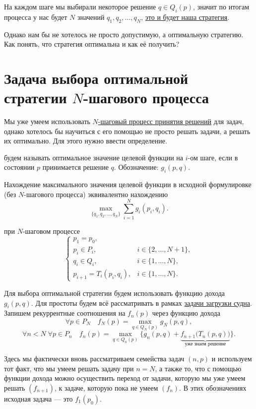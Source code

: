 На каждом шаге мы выбирали некоторое решение $q \in Q_i(p)$, значит по итогам процесса у нас будет $N$ значений $q_1, q_2, \dots, q_N$, \underline{это и будет наша стратегия}.

Однако нам бы не хотелось не просто допустимую, а оптимальную стратегию. Как понять, что стратегия оптимальна и как её получить?

\section{Задача выбора оптимальной стратегии $N$-шагового процесса}

Мы уже умеем использовать \hyperref[def:n_step_process]{$N$-шаговый процесс принятия решений} для задач, однако хотелось бы научиться с его помощью не просто решать задачи, а решать их оптимально. Для этого нужно ввести определение.


 будем называть оптимальное значение целевой функции на $i$-ом шаге, если в состоянии $p$ принимается решение $q$. Обозначение: $\boxed{g_i(p, q)}$.

\fact

Нахождение максимального значения целевой функции в исходной формулировке (без $N$-шагового процесса) эквивалентно нахождению
\[
\max_{\{q_1, q_2, \dots, q_N\}} \sum_{i=1}^{N} g_i(p_i, q_i).
\]

при $N$-шаговом процессе
\[
\begin{cases}
p_1 = p_0, \\	
p_i \in P_i, &i \in \{2, \dots, N+1\}, \\
q_i \in Q_i, &i \in \{1, \dots, N\}, \\
p_{i+1} = T_i(p_i, q_i), &i \in \{1, \dots, N\}.
\end{cases}
\]

\label{def:opt_strategy}

Для выбора оптимальной стратегии будем использовать функцию дохода $g_i(p, q)$. Для простоты будем всё рассматривать в рамках \hyperref[pr:loading_vessel]{задачи загрузки судна}. Запишем рекуррентные соотношения на $f_n(p)$ через функцию дохода
\[
\forall p \in P_{N} \quad f_N(p) = \max_{q \in Q_{N}(p)} g_N(p, q),
\]
\[
\forall n < N \; \forall p \in P_n \quad f_n(p) = \max_{q \in Q_{n}(p)} \Big\{g_n(p, q) + \underbrace{f_{n+1}\big(T_{n}(p, q)\big)}_{\text{уже знаем решение}}\Big\}.
\]

Здесь мы фактически вновь рассматриваем семейства задач $(n, p)$ и используем тот факт, что мы умеем решать задачу при $n = N$, а также то, что с помощью функции дохода можно осуществить переход от задачи, которую мы уже умеем решать $(f_{n+1})$, к задаче, которую пока не умеем $(f_n)$. В этих обозначениях исходная задача --- это $f_1(p_0)$.


